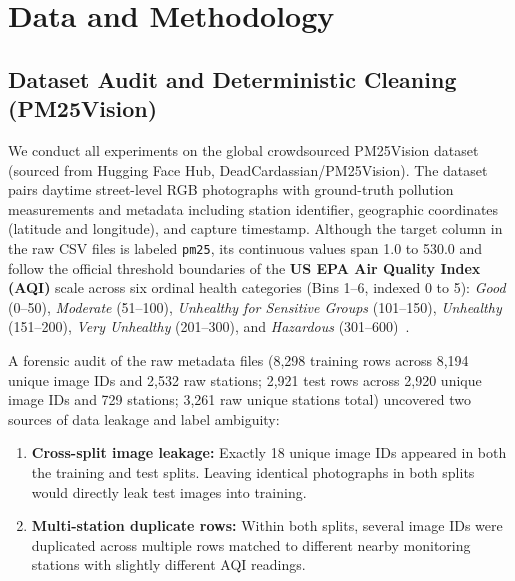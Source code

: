 \documentclass[conference]{IEEEtran}
\begin{document}
\section{Data and Methodology}
\label{sec:data_methodology}

\subsection{Dataset Audit and Deterministic Cleaning (PM25Vision)}
\label{subsec:dataset_cleaning}

We conduct all experiments on the global crowdsourced PM25Vision dataset
(sourced from Hugging Face Hub, DeadCardassian/PM25Vision). The dataset pairs
daytime street-level RGB photographs with ground-truth pollution measurements
and metadata including station identifier, geographic coordinates (latitude and
longitude), and capture timestamp. Although the target column in the raw CSV
files is labeled \texttt{pm25}, its continuous values span 1.0 to 530.0 and
follow the official threshold boundaries of the \textbf{US EPA Air Quality Index
(AQI)} scale across six ordinal health categories (Bins 1--6, indexed 0 to 5):
\textit{Good} (0--50), \textit{Moderate} (51--100), \textit{Unhealthy for
Sensitive Groups} (101--150), \textit{Unhealthy} (151--200), \textit{Very
Unhealthy} (201--300), and \textit{Hazardous}
(301--600)~\cite{wangLightweightAirQuality2024,
wangPrototypeFeatureRepresentationGuided2026}.

A forensic audit of the raw metadata files (8,298 training rows across 8,194
unique image IDs and 2,532 raw stations; 2,921 test rows across 2,920 unique
image IDs and 729 stations; 3,261 raw unique stations total) uncovered two
sources of data leakage and label ambiguity:
\begin{enumerate}
  \item \textbf{Cross-split image leakage:} Exactly 18 unique image IDs appeared
        in both the training and test splits. Leaving identical photographs in
        both splits would directly leak test images into training.
  \item \textbf{Multi-station duplicate rows:} Within both splits, several image
        IDs were duplicated across multiple rows matched to different nearby
        monitoring stations with slightly different AQI readings.
\end{enumerate}
\end{document}
